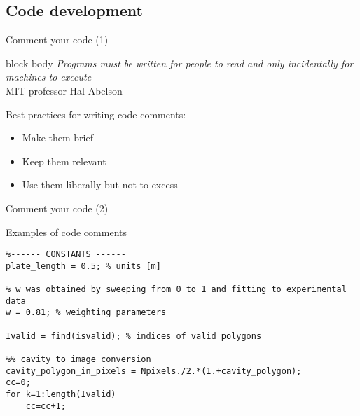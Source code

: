 \documentclass[10pt,aspectratio=169,notes]{beamer} %
\begin{document}
\subsection{Code development}
\begin{frame}[label=frame17]{Comment your code (1)}
\begin{beamercolorbox}[wd=0.8\textwidth,rounded=true,shadow=true]{block body}
	\emph{Programs must be written for people to read and only incidentally for machines to execute}\\
	\flushright
	MIT professor Hal Abelson
\end{beamercolorbox}

Best practices for writing code comments:
\begin{itemize}
\item Make them brief
\item Keep them relevant
\item Use them liberally but not to excess
\end{itemize}	
\end{frame}
\begin{frame}[fragile,label=frame18]{Comment your code (2)}
\begin{block}{Examples of code comments}
\begin{verbatim}
%------ CONSTANTS ------
plate_length = 0.5; % units [m]

% w was obtained by sweeping from 0 to 1 and fitting to experimental data
w = 0.81; % weighting parameters 

Ivalid = find(isvalid); % indices of valid polygons

%% cavity to image conversion
cavity_polygon_in_pixels = Npixels./2.*(1.+cavity_polygon); 
cc=0;
for k=1:length(Ivalid)
    cc=cc+1;
\end{verbatim}
\end{block} 
\end{frame}  
\end{document}
